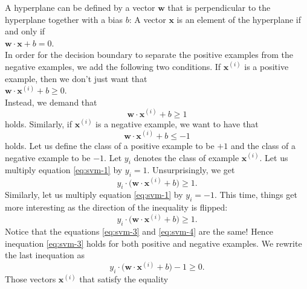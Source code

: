 A hyperplane can be defined by a vector $\mathbf{w}$ that is perpendicular to the hyperplane together with a
bias $b$:  A vector $\mathbf{x}$ is an element of the hyperplane if and only if
\\[0.2cm]
\hspace*{1.3cm}
$\mathbf{w} \cdot \mathbf{x} + b = 0$.
\\[0.2cm]
In order for the decision boundary to separate the positive examples from the negative examples, we add the
following two conditions.  If $\mathbf{x}^{(i)}$ is a positive example, then we don't just want that 
\\[0.2cm]
\hspace*{1.3cm}
$\mathbf{w} \cdot \mathbf{x}^{(i)} + b \geq 0$.
\\[0.2cm]
Instead, we demand that 
\begin{equation}
  \label{eq:svm-1}
  \mathbf{w} \cdot \mathbf{x}^{(i)} + b \geq 1
\end{equation}
holds.  Similarly, if $\mathbf{x}^{(i)}$ is a negative example, we want to have that
\begin{equation}
  \label{eq:svm-2}
    \mathbf{w} \cdot \mathbf{x}^{(i)} + b \leq -1
\end{equation}
holds.  Let us define the class of a positive example to be $+1$ and the
class of a negative example to be $-1$.  Let $y_i$ denotes the class of example $\mathbf{x}^{(i)}$.
Let us multiply equation \ref{eq:svm-1} by $y_i = 1$.  Unsurprisingly, we get
\begin{equation}
  \label{eq:svm-3}
  y_i \cdot \bigl(\mathbf{w} \cdot \mathbf{x}^{(i)} + b) \geq 1.
\end{equation}
Similarly, let us multiply equation \ref{eq:svm-1} by $y_i = -1$.  This time, things get more interesting
as the direction of the inequality is flipped:
\begin{equation}
  \label{eq:svm-4}
    y_i \cdot \bigl(\mathbf{w} \cdot \mathbf{x}^{(i)} + b) \geq 1.
\end{equation}
Notice that the equations \ref{eq:svm-3} and \ref{eq:svm-4} are the same!  Hence
inequation \ref{eq:svm-3} holds for both positive and negative examples.  We rewrite the last inequation as
\begin{equation}
  \label{eq:svm-5}
    y_i \cdot \bigl(\mathbf{w} \cdot \mathbf{x}^{(i)} + b\bigr) - 1 \geq 0.
\end{equation}
Those vectors $\mathbf{x}^{(i)}$ that satisfy the equality
\\[0.2cm]
\hspace*{1.3cm}
